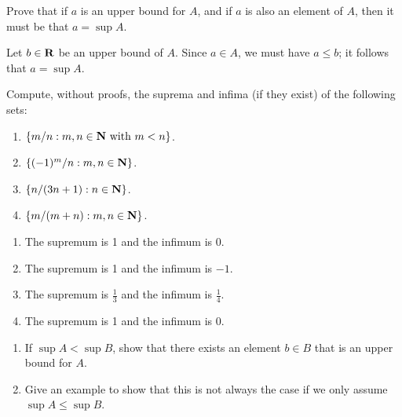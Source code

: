 \documentclass{lew98_solutions}
\begin{document}
\begin{exercise}
\label{ex:1.3.7}
    Prove that if \( a \) is an upper bound for \( A \), and if \( a \) is also an element of \( A \), then it must be that \( a = \sup A \).
\end{exercise}

\begin{solution}
    Let \( b \in \mathbf{R} \) be an upper bound of \( A \). Since \( a \in A \), we must have \( a \leq b \); it follows that \( a = \sup A \).
\end{solution}

\begin{exercise}
\label{ex:1.3.8}
    Compute, without proofs, the suprema and infima (if they exist) of the following sets:
    \begin{enumerate}
        \item \( \{ m/n : m, n \in \mathbf{N} \text{ with } m < n \} \).

        \item \( \{ (-1)^m/n : m, n \in \mathbf{N} \} \).

        \item \( \{ n/(3n+1) : n \in \mathbf{N} \} \).

        \item \( \{ m/(m+n) : m, n \in \mathbf{N} \} \).
    \end{enumerate}
\end{exercise}

\begin{solution}
    \begin{enumerate}
        \item The supremum is 1 and the infimum is 0.

        \item The supremum is 1 and the infimum is \( -1 \).

        \item The supremum is \( \tfrac{1}{3} \) and the infimum is \( \tfrac{1}{4} \).

        \item The supremum is 1 and the infimum is 0.
    \end{enumerate}
\end{solution}

\begin{exercise}
\label{ex:1.3.9}
    \begin{enumerate}
        \item If \( \sup A < \sup B \), show that there exists an element \( b \in B \) that is an upper bound for \( A \).

        \item Give an example to show that this is not always the case if we only assume \( \sup A \leq \sup B \).
    \end{enumerate}
\end{exercise}
\end{document}
